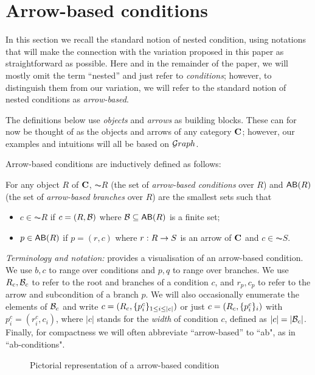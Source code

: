 \section{Arrow-based conditions}

In this section we recall the standard notion of nested condition, using notations that will make the connection with the variation proposed in this paper as straightforward as possible. Here and in the remainder of the paper, we will mostly omit the term ``nested'' and just refer to \emph{conditions}; however, to distinguish them from our variation, we will refer to the standard notion of nested conditions as \emph{arrow-based}.

The definitions below use \emph{objects} and \emph{arrows} as building blocks. These can for now be thought of as the objects and arrows of any category $\mathbf{C}$; however, our examples and intuitions will all be based on ${\mathcal Graph}$.

Arrow-based conditions are inductively defined as follows:

\begin{definition}
  For any object $R$ of $\mathbf{C}$, $\AC R$ (the set of \emph{arrow-based conditions} over $R$) and $\AB R$ (the set of \emph{arrow-based branches} over $R$) are the smallest sets such that
  \begin{itemize}
  \item $c\in \AC R$ if $c=(R,\mathcal{B})$ where $\cB\subseteq \AB R$ is a finite set;
  \item $p\in \AB R$ if $p=(r,c)$ where $r: R\rightarrow S$ is an arrow of $\mathbf{C}$ and $c\in \AC S$.
  \end{itemize}
\end{definition}

\medskip\noindent
\emph{Terminology and notation:}  provides a visualisation of an arrow-based condition. We use $b,c$ to range over conditions and $p,q$ to range over branches. We use $R_c,\mathcal{B}_c$ to refer to the root and branches of a condition $c$, and $r_p,c_p$ to refer to the arrow and subcondition of a branch $p$. We will also occasionally enumerate the elements of $\mathcal{B}_c$ and write $c=(R_c, \{{p^c_i}\}_{1\leq i\leq |c|})$ or just $c=(R_c, \{{p^c_i}\}_i)$ with $p^c_i=(r^c_i,c_i)$, where $|c|$ stands for the \emph{width} of condition $c$, defined as $|c|=|\mathcal{B}_c|$. Finally, for compactness we will often abbreviate ``arrow-based'' to ``ab", as in ``ab-conditions".
%
\begin{figure}
  \centering
  
  \caption{Pictorial representation of a arrow-based condition}
\end{figure}

